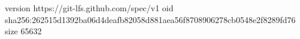 version https://git-lfs.github.com/spec/v1
oid sha256:262515d1392ba06d4deafb82058d881aea56f8708906278cb0548e2f8289fd76
size 65632
